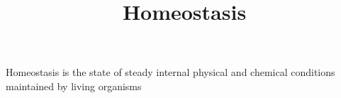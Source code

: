 \documentclass[a4paper]{article}
\title{Homeostasis}
\date{}
\begin{document}
    \maketitle
    
    Homeostasis is the state of steady internal physical and chemical conditions maintained by living organisms
    
    
\end{document}

